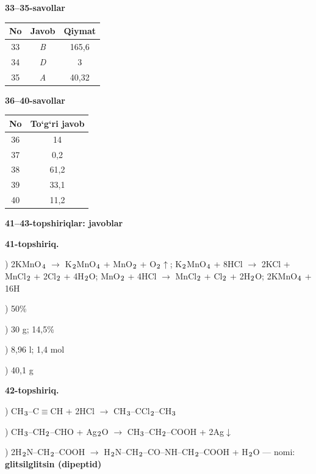 \documentclass[11pt,a4paper]{article}
\renewcommand{\textsubscript}[1]{\ensuremath{_{\text{\fontsize{8}{8}\selectfont #1}}}}
\begin{document}
\noindent\textbf{33--35-savollar}\par\smallskip
\noindent\begin{tabular}{|c|c|c|}\hline \textbf{No} & \textbf{Javob} & \textbf{Qiymat}\\\hline
33 & \textsl{B} & 165,6\\\hline
34 & \textsl{D} & 3\\\hline
35 & \textsl{A} & 40,32\\\hline
\end{tabular}\par\medskip
\noindent\textbf{36--40-savollar}\par\smallskip
\noindent\begin{tabular}{|c|c|}\hline \textbf{No} & \textbf{To`g`ri javob}\\\hline
36 & 14\\\hline
37 & 0,2\\\hline
38 & 61,2\\\hline
39 & 33,1\\\hline
40 & 11,2\\\hline
\end{tabular}\par\medskip
\noindent\textbf{41--43-topshiriqlar: javoblar}\par\smallskip
\noindent\textbf{41-topshiriq.}\par
{}) 2KMnO\textsubscript{4} $\to$ K\textsubscript{2}MnO\textsubscript{4} + MnO\textsubscript{2} + O\textsubscript{2}$\uparrow$; K\textsubscript{2}MnO\textsubscript{4} + 8HCl $\to$ 2KCl + MnCl\textsubscript{2} + 2Cl\textsubscript{2} + 4H\textsubscript{2}O; MnO\textsubscript{2} + 4HCl $\to$ MnCl\textsubscript{2} + Cl\textsubscript{2} + 2H\textsubscript{2}O; 2KMnO\textsubscript{4} + 16H\par
{}) 50\%\par
{}) 30 g; 14,5\%\par
{}) 8,96 l; 1,4 mol\par
{}) 40,1 g\par
\noindent\textbf{42-topshiriq.}\par
{}) CH\textsubscript{3}--C$\equiv$CH + 2HCl $\to$ CH\textsubscript{3}--CCl\textsubscript{2}--CH\textsubscript{3}\par
{}) CH\textsubscript{3}--CH\textsubscript{2}--CHO + Ag\textsubscript{2}O $\to$ CH\textsubscript{3}--CH\textsubscript{2}--COOH + 2Ag$\downarrow$\par
{}) 2H\textsubscript{2}N--CH\textsubscript{2}--COOH $\to$ H\textsubscript{2}N--CH\textsubscript{2}--CO--NH--CH\textsubscript{2}--COOH + H\textsubscript{2}O --- nomi: \textbf{glitsilglitsin (dipeptid)}\par
\end{document}
